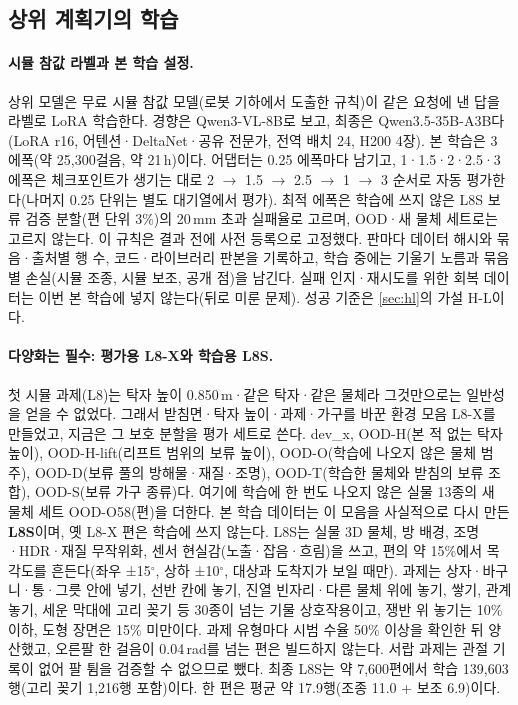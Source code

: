 \subsection{상위 계획기의 학습}
\label{sec:training}
\paragraph{시뮬 참값 라벨과 본 학습 설정.} 상위 모델은 무료 시뮬 참값 모델(로봇 기하에서 도출한 규칙)이 같은 요청에 낸 답을 라벨로 LoRA 학습한다. 경향은 Qwen3-VL-8B로 보고, 최종은 Qwen3.5-35B-A3B다(LoRA r16, 어텐션·DeltaNet·공유 전문가, 전역 배치 24, H200 4장). 본 학습은 3 에폭(약 25,300걸음, 약 21\,h)이다. 어댑터는 0.25 에폭마다 남기고, 1·1.5·2·2.5·3 에폭은 체크포인트가 생기는 대로 2 $\rightarrow$ 1.5 $\rightarrow$ 2.5 $\rightarrow$ 1 $\rightarrow$ 3 순서로 자동 평가한다(나머지 0.25 단위는 별도 대기열에서 평가). 최적 에폭은 학습에 쓰지 않은 L8S 보류 검증 분할(편 단위 3\%)의 20\,mm 초과 실패율로 고르며, OOD·새 물체 세트로는 고르지 않는다. 이 규칙은 결과 전에 사전 등록으로 고정했다. 판마다 데이터 해시와 묶음·출처별 행 수, 코드·라이브러리 판본을 기록하고, 학습 중에는 기울기 노름과 묶음별 손실(시뮬 조종, 시뮬 보조, 공개 점)을 남긴다. 실패 인지·재시도를 위한 회복 데이터는 이번 본 학습에 넣지 않는다(뒤로 미룬 문제). 성공 기준은 \cref{sec:hl}의 가설 H-L이다.

\paragraph{다양화는 필수: 평가용 L8-X와 학습용 L8S.} 첫 시뮬 과제(L8)는 탁자 높이 0.850\,m·같은 탁자·같은 물체라 그것만으로는 일반성을 얻을 수 없었다. 그래서 받침면·탁자 높이·과제·가구를 바꾼 환경 모음 L8-X를 만들었고, 지금은 그 보호 분할을 평가 세트로 쓴다. dev\_x, OOD-H(본 적 없는 탁자 높이), OOD-H-lift(리프트 범위의 보류 높이), OOD-O(학습에 나오지 않은 물체 범주), OOD-D(보류 풀의 방해물·재질·조명), OOD-T(학습한 물체와 받침의 보류 조합), OOD-S(보류 가구 종류)다. 여기에 학습에 한 번도 나오지 않은 실물 13종의 새 물체 세트 OOD-O58(편)을 더한다. 본 학습 데이터는 이 모음을 사실적으로 다시 만든 \textbf{L8S}이며, 옛 L8-X 편은 학습에 쓰지 않는다. L8S는 실물 3D 물체, 방 배경, 조명·HDR·재질 무작위화, 센서 현실감(노출·잡음·흐림)을 쓰고, 편의 약 15\%에서 목 각도를 흔든다(좌우 ±15$^\circ$, 상하 ±10$^\circ$, 대상과 도착지가 보일 때만). 과제는 상자·바구니·통·그릇 안에 넣기, 선반 칸에 놓기, 진열 빈자리·다른 물체 위에 놓기, 쌓기, 관계 놓기, 세운 막대에 고리 꽂기 등 30종이 넘는 기물 상호작용이고, 쟁반 위 놓기는 10\% 이하, 도형 장면은 15\% 미만이다. 과제 유형마다 시범 수율 50\% 이상을 확인한 뒤 양산했고, 오른팔 한 걸음이 0.04\,rad를 넘는 편은 빌드하지 않는다. 서랍 과제는 관절 기록이 없어 팔 튐을 검증할 수 없으므로 뺐다. 최종 L8S는 약 7,600편에서 학습 139,603행(고리 꽂기 1,216행 포함)이다. 한 편은 평균 약 17.9행(조종 11.0 + 보조 6.9)이다.

